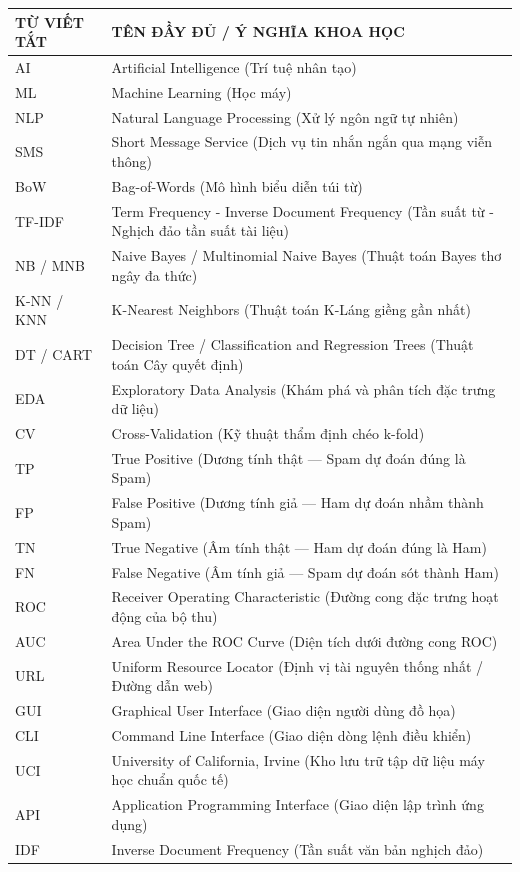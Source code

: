 
\begin{table}[H]
\centering
\fontsize{12pt}{15pt}\selectfont
\begin{tabular}{|p{3.5cm}|p{11.5cm}|}
\hline
\centering\textbf{TỪ VIẾT TẮT} & \centering\arraybackslash\textbf{TÊN ĐẦY ĐỦ / Ý NGHĨA KHOA HỌC} \\
\hline
AI & Artificial Intelligence (Trí tuệ nhân tạo) \\
\hline
ML & Machine Learning (Học máy) \\
\hline
NLP & Natural Language Processing (Xử lý ngôn ngữ tự nhiên) \\
\hline
SMS & Short Message Service (Dịch vụ tin nhắn ngắn qua mạng viễn thông) \\
\hline
BoW & Bag-of-Words (Mô hình biểu diễn túi từ) \\
\hline
TF-IDF & Term Frequency - Inverse Document Frequency (Tần suất từ - Nghịch đảo tần suất tài liệu) \\
\hline
NB / MNB & Naive Bayes / Multinomial Naive Bayes (Thuật toán Bayes thơ ngây đa thức) \\
\hline
K-NN / KNN & K-Nearest Neighbors (Thuật toán K-Láng giềng gần nhất) \\
\hline
DT / CART & Decision Tree / Classification and Regression Trees (Thuật toán Cây quyết định) \\
\hline
EDA & Exploratory Data Analysis (Khám phá và phân tích đặc trưng dữ liệu) \\
\hline
CV & Cross-Validation (Kỹ thuật thẩm định chéo k-fold) \\
\hline
TP & True Positive (Dương tính thật --- Spam dự đoán đúng là Spam) \\
\hline
FP & False Positive (Dương tính giả --- Ham dự đoán nhầm thành Spam) \\
\hline
TN & True Negative (Âm tính thật --- Ham dự đoán đúng là Ham) \\
\hline
FN & False Negative (Âm tính giả --- Spam dự đoán sót thành Ham) \\
\hline
ROC & Receiver Operating Characteristic (Đường cong đặc trưng hoạt động của bộ thu) \\
\hline
AUC & Area Under the ROC Curve (Diện tích dưới đường cong ROC) \\
\hline
URL & Uniform Resource Locator (Định vị tài nguyên thống nhất / Đường dẫn web) \\
\hline
GUI & Graphical User Interface (Giao diện người dùng đồ họa) \\
\hline
CLI & Command Line Interface (Giao diện dòng lệnh điều khiển) \\
\hline
UCI & University of California, Irvine (Kho lưu trữ tập dữ liệu máy học chuẩn quốc tế) \\
\hline
API & Application Programming Interface (Giao diện lập trình ứng dụng) \\
\hline
IDF & Inverse Document Frequency (Tần suất văn bản nghịch đảo) \\
\hline
\end{tabular}
\end{table}